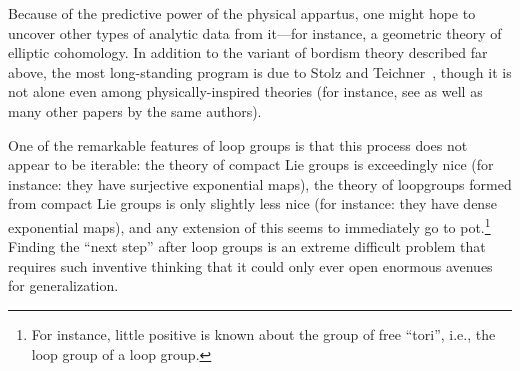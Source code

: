 Because of the predictive power of the physical appartus, one might hope to uncover other types of analytic data from it---for instance, a geometric theory of elliptic cohomology.  In addition to the variant of bordism theory described far above, the most long-standing program is due to Stolz and Teichner~\cite{StolzTeichnerWhatIs,StolzTeichnerSusy}, though it is not alone even among physically-inspired theories (for instance, see \cite{DouglasHenriques} as well as many other papers by the same authors).

One of the remarkable features of loop groups is that this process does not appear to be iterable: the theory of compact Lie groups is exceedingly nice (for instance: they have surjective exponential maps), the theory of loopgroups formed from compact Lie groups is only slightly less nice (for instance: they have dense exponential maps), and any extension of this seems to immediately go to pot.\footnote{For instance, little positive is known about the group of free ``tori'', i.e., the loop group of a loop group.}  Finding the ``next step'' after loop groups is an extreme difficult problem that requires such inventive thinking that it could only ever open enormous avenues for generalization.








